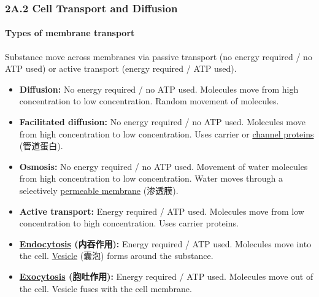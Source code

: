 
\subsubsection{2A.2 Cell Transport and Diffusion}
\paragraph{Types of membrane transport}
Substance move across membranes via passive transport (no energy required / no ATP used) or active transport (energy required /
ATP used).
\begin{itemize}
    \item \textbf{Diffusion:} No energy required / no ATP used. Molecules move from high concentration to low concentration.
    Random movement of molecules.
    \item \textbf{Facilitated diffusion:} No energy required / no ATP used. Molecules move from high concentration to low
    concentration. Uses carrier or \underline{channel proteins} (管道蛋白).
    \item \textbf{Osmosis:} No energy required / no ATP used. Movement of water molecules from high concentration to low
    concentration. Water moves through a selectively \underline{permeable membrane} (渗透膜).
    \item \textbf{Active transport:} Energy required / ATP used. Molecules move from low concentration to high concentration.
    Uses carrier proteins.
    \item \textbf{\underline{Endocytosis} (内吞作用):} Energy required / ATP used. Molecules move into the cell.
    \underline{Vesicle} (囊泡) forms around the substance.
    \item \textbf{\underline{Exocytosis} (胞吐作用):} Energy required / ATP used. Molecules move out of the cell.
    Vesicle fuses with the cell membrane.
\end{itemize}

